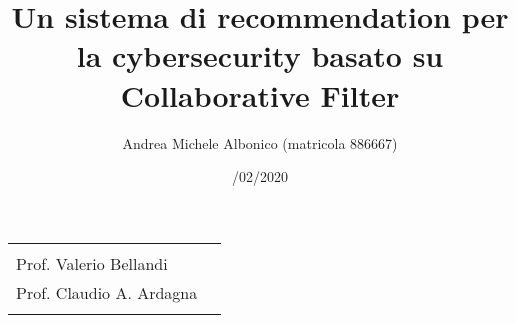 \documentclass[10pt,a4paper]{article}
\begin{document}
\title{\textbf{Un sistema di recommendation per la cybersecurity basato su Collaborative Filter}}
\author{Andrea Michele Albonico (matricola 886667)}
\date{/02/2020}

\maketitle

\vspace{0.5 cm}

\begin{minipage}{\linewidth}
    \begin{tabular}{l r}
        \begin{minipage}[t]{.4\linewidth}
            \begin{flushleft}
                {
                    RELATORE\\[.15cm]
                    Prof. Valerio Bellandi
                }
            \end{flushleft}
        \end{minipage}
        &
        \begin{minipage}[t]{.53\linewidth}
            \begin{flushright}
                {
                    CORRELATORE\\[.15cm]
                    Prof. Claudio A. Ardagna\\[.1cm]
                }
            \end{flushright}
        \end{minipage}
    \end{tabular}
\end{minipage}

\vspace{2 cm}
\end{document}
